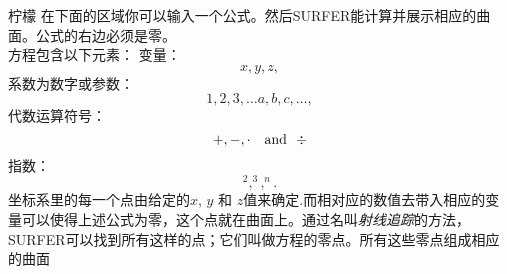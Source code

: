 ﻿\begin{surferPage}{柠檬}
在下面的区域你可以输入一个公式。然后SURFER能计算并展示相应的曲面。公式的右边必须是零。
\\
方程包含以下元素：
\newline
变量：
\[x, y, z, \]
系数为数字或参数：
\[1, 2, 3, \dots a, b, c, \dots, \]
代数运算符号：
\[+,  - , \cdot \quad \textnormal{and}\ \ \div\]
指数：
\[ ^2, ^3, ^n .\]
坐标系里的每一个点由给定的$x$, $y$ 和 $z$值来确定.而相对应的数值去带入相应的变量可以使得上述公式为零，这个点就在曲面上。通过名叫\textit{射线追踪}的方法，SURFER可以找到所有这样的点；它们叫做方程的零点。所有这些零点组成相应的曲面
\end{surferPage}
